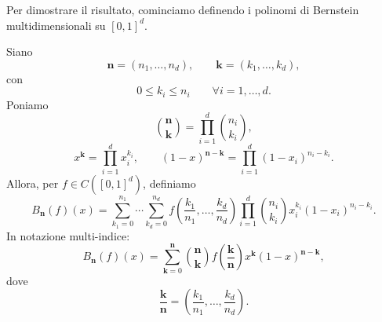 \documentclass[a4paper]{article}
\begin{document}
Per dimostrare il risultato, cominciamo definendo i polinomi di Bernstein multidimensionali su \([0,1]^d\).

Siano
\[
    \mathbf n=(n_1,\dots,n_d),
    \qquad
    \mathbf k=(k_1,\dots,k_d),
\]
con
\[
    0\leq k_i\leq n_i
    \qquad
    \forall i=1,\dots,d.
\]
Poniamo
\[
    \binom{\mathbf n}{\mathbf k}
    =
    \prod_{i=1}^{d}
    \binom{n_i}{k_i},
\]
\[
    x^{\mathbf k}
    =
    \prod_{i=1}^{d}
    x_i^{k_i},
    \qquad
    (1-x)^{\mathbf n-\mathbf k}
    =
    \prod_{i=1}^{d}
    (1-x_i)^{n_i-k_i}.
\]
Allora, per \(f\in C([0,1]^d)\), definiamo
\[
    B_{\mathbf n}(f)(x)
    =
    \sum_{k_1=0}^{n_1}
    \cdots
    \sum_{k_d=0}^{n_d}
    f\left(
        \frac{k_1}{n_1},
        \dots,
        \frac{k_d}{n_d}
    \right)
    \prod_{i=1}^{d}
    \binom{n_i}{k_i}
    x_i^{k_i}
    (1-x_i)^{n_i-k_i}.
\]
In notazione multi-indice:
\[
    B_{\mathbf n}(f)(x)
    =
    \sum_{\mathbf k=0}^{\mathbf n}
    \binom{\mathbf n}{\mathbf k}
    f\left(\frac{\mathbf k}{\mathbf n}\right)
    x^{\mathbf k}
    (1-x)^{\mathbf n-\mathbf k},
\]
dove
\[
    \frac{\mathbf k}{\mathbf n}
    =
    \left(
        \frac{k_1}{n_1},
        \dots,
        \frac{k_d}{n_d}
    \right).
\]
\end{document}
